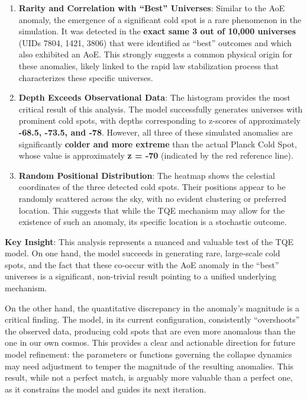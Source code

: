 \begin{enumerate}
\def\labelenumi{\arabic{enumi}.}
\item
  \textbf{Rarity and Correlation with ``Best'' Universes}: Similar to
  the AoE anomaly, the emergence of a significant cold spot is a rare
  phenomenon in the simulation. It was detected in the \textbf{exact
  same 3 out of 10,000 universes} (UIDs 7804, 1421, 3806) that were
  identified as ``best'' outcomes and which also exhibited an AoE. This
  strongly suggests a common physical origin for these anomalies, likely
  linked to the rapid law stabilization process that characterizes these
  specific universes.
\item
  \textbf{Depth Exceeds Observational Data}: The histogram provides the
  most critical result of this analysis. The model successfully
  generates universes with prominent cold spots, with depths
  corresponding to z-scores of approximately \textbf{-68.5, -73.5, and
  -78}. However, all three of these simulated anomalies are
  significantly \textbf{colder and more extreme} than the actual Planck
  Cold Spot, whose value is approximately \textbf{z = -70} (indicated by
  the red reference line).
\item
  \textbf{Random Positional Distribution}: The heatmap shows the
  celestial coordinates of the three detected cold spots. Their
  positions appear to be randomly scattered across the sky, with no
  evident clustering or preferred location. This suggests that while the
  TQE mechanism may allow for the existence of such an anomaly, its
  specific location is a stochastic outcome.
\end{enumerate}

\textbf{Key Insight}: This analysis represents a nuanced and valuable
test of the TQE model. On one hand, the model succeeds in generating
rare, large-scale cold spots, and the fact that these co-occur with the
AoE anomaly in the ``best'' universes is a significant, non-trivial
result pointing to a unified underlying mechanism.

On the other hand, the quantitative discrepancy in the anomaly's
magnitude is a critical finding. The model, in its current
configuration, consistently ``overshoots'' the observed data, producing
cold spots that are even more anomalous than the one in our own cosmos.
This provides a clear and actionable direction for future model
refinement: the parameters or functions governing the collapse dynamics
may need adjustment to temper the magnitude of the resulting anomalies.
This result, while not a perfect match, is arguably more valuable than a
perfect one, as it constrains the model and guides its next iteration.

